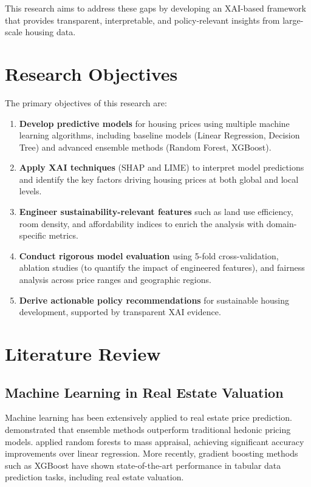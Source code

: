 \documentclass[12pt, a4paper]{article}
\begin{document}
This research aims to address these gaps by developing an XAI-based framework that provides transparent, interpretable, and policy-relevant insights from large-scale housing data.

\section{Research Objectives}

The primary objectives of this research are:

\begin{enumerate}[label=\arabic*.]
    \item \textbf{Develop predictive models} for housing prices using multiple machine learning algorithms, including baseline models (Linear Regression, Decision Tree) and advanced ensemble methods (Random Forest, XGBoost).
    
    \item \textbf{Apply XAI techniques} (SHAP and LIME) to interpret model predictions and identify the key factors driving housing prices at both global and local levels.
    
    \item \textbf{Engineer sustainability-relevant features} such as land use efficiency, room density, and affordability indices to enrich the analysis with domain-specific metrics.
    
    \item \textbf{Conduct rigorous model evaluation} using 5-fold cross-validation, ablation studies (to quantify the impact of engineered features), and fairness analysis across price ranges and geographic regions.
    
    \item \textbf{Derive actionable policy recommendations} for sustainable housing development, supported by transparent XAI evidence.
\end{enumerate}

\section{Literature Review}

\subsection{Machine Learning in Real Estate Valuation}

Machine learning has been extensively applied to real estate price prediction. \citet{park2015using} demonstrated that ensemble methods outperform traditional hedonic pricing models. \citet{antipov2012mass} applied random forests to mass appraisal, achieving significant accuracy improvements over linear regression. More recently, gradient boosting methods such as XGBoost \citep{chen2016xgboost} have shown state-of-the-art performance in tabular data prediction tasks, including real estate valuation.
\end{document}
